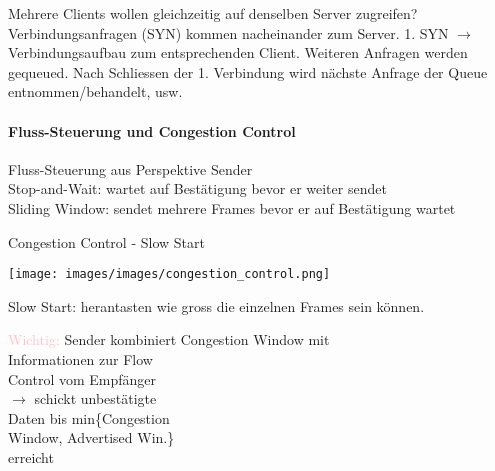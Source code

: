 \begin{remark}
    Mehrere Clients wollen gleichzeitig auf denselben Server zugreifen?\\
    Verbindungsanfragen (SYN) kommen nacheinander zum Server. 1. SYN $\rightarrow$ Verbindungsaufbau zum entsprechenden Client. 
    Weiteren Anfragen werden gequeued. Nach Schliessen der 1. Verbindung wird nächste Anfrage der Queue entnommen/behandelt, usw.
\end{remark}




\paragraph*{Fluss-Steuerung und Congestion Control}



\begin{concept}{Fluss-Steuerung} aus Perspektive Sender\\
    Stop-and-Wait: wartet auf Bestätigung bevor er weiter sendet\\
    Sliding Window: sendet mehrere Frames bevor er auf Bestätigung wartet
\end{concept}

\begin{concept}{Congestion Control - Slow Start}\\
    \begin{minipage}{0.6\linewidth}
        \texttt{[image: images/images/congestion\_control.png]}
    \end{minipage}
    \begin{minipage}{0.39\linewidth}
        {\small
        Slow Start: herantasten wie gross die einzelnen Frames sein können.

        \vspace{1mm}

        \textcolor{pink}{Wichtig:} Sender kombiniert Congestion Window mit\\ Informationen zur Flow\\ Control vom Empfänger\\ $\rightarrow$ schickt unbestätigte \\Daten bis min\{Congestion\\ Window, Advertised Win.\}\\ erreicht
        }
    \end{minipage}
\end{concept}



